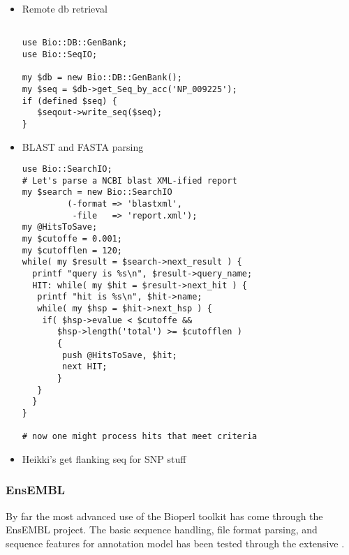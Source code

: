 \documentclass{article}
\begin{document}
\begin{twocolumn}
\begin{itemize}
\begin{scriptsize}
\begin{verbatim}
sub ncbi_idparse { 
 my ($id) = @_;
 my @ids = split(/\|/,$id);
 my $acc = ($ids[3] =~ /(\S+)\.\d+/);	
 return ( $ids[1],$acc,$ids[3]);	
}
\end{verbatim}
\end{scriptsize}

\item Remote db retrieval
\begin{scriptsize}
\begin{verbatim}

use Bio::DB::GenBank;
use Bio::SeqIO;

my $db = new Bio::DB::GenBank();
my $seq = $db->get_Seq_by_acc('NP_009225');
if (defined $seq) {
   $seqout->write_seq($seq);
}
\end{verbatim}
\end{scriptsize}

\item BLAST and FASTA parsing
\begin{scriptsize}
\begin{verbatim}
use Bio::SearchIO;
# Let's parse a NCBI blast XML-ified report  
my $search = new Bio::SearchIO
         (-format => 'blastxml',
          -file   => 'report.xml');
my @HitsToSave;
my $cutoffe = 0.001;
my $cutofflen = 120;
while( my $result = $search->next_result ) {
  printf "query is %s\n", $result->query_name;
  HIT: while( my $hit = $result->next_hit ) {
   printf "hit is %s\n", $hit->name;
   while( my $hsp = $hit->next_hsp ) {
    if( $hsp->evalue < $cutoffe &&
       $hsp->length('total') >= $cutofflen ) 
       {
	    push @HitsToSave, $hit;
	    next HIT;
       } 
   }
  }
}

# now one might process hits that meet criteria

\end{verbatim}
\end{scriptsize}

\item Heikki's get flanking seq for SNP stuff

\end{itemize}

\subsubsection{EnsEMBL}

By far the most advanced use of the Bioperl toolkit has come through
the EnsEMBL project.  The basic sequence handling, file format
parsing, and sequence features for annotation model has been tested
through the extensive .


\end{twocolumn}
\end{document}
